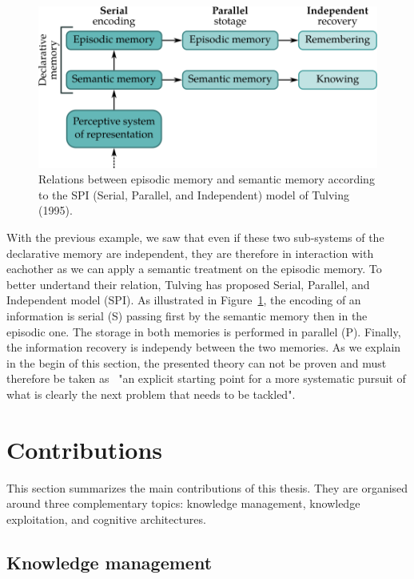 \begin{figure}[h!]
\centering
\includegraphics[scale=0.45]{figures/introduction/SPI.png}
\caption{\label{fig:SPI} Relations between episodic memory and semantic memory according to the SPI (Serial, Parallel, and Independent) model of Tulving (1995).}
\end{figure}

With the previous example, we saw that even if these two sub-systems of the declarative memory are independent, they are therefore in interaction with eachother as we can apply a semantic treatment on the episodic memory. To better undertand their relation, Tulving has proposed Serial, Parallel, and Independent model (SPI). As illustrated in Figure~\ref{fig:SPI}, the encoding of an information is serial (S) passing first by the semantic memory then in the episodic one. The storage in both memories is performed in parallel (P). Finally, the information recovery is independy between the two memories.
As we explain in the begin of this section, the presented theory can not be proven and must therefore be taken as~\cite{tulving_1995_organization} "an explicit starting point for a more systematic pursuit of what is clearly the next problem that needs to be tackled".

\section{Contributions}

This section summarizes the main contributions of this thesis. They are organised around three complementary topics: knowledge management, knowledge exploitation, and cognitive architectures.

\subsection{Knowledge management}

